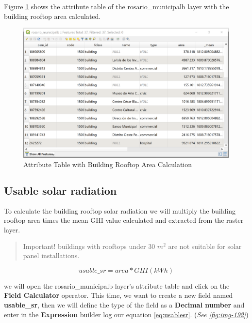 \documentclass[
]{book}
\begin{document}
Figure \ref{fig:img-191} shows the attribute table of the {rosario\_municipalb} layer with the building rooftop area calculated.

\begin{figure}

{\centering \includegraphics[width=1\linewidth]{images/processing4} 

}

\caption{Attribute Table with Building Rooftop Area Calculation}\label{fig:img-191}
\end{figure}

\hypertarget{usable-solar-radiation}{%
\subsection{Usable solar radiation}\label{usable-solar-radiation}}

To calculate the building rooftop solar radiation we will multiply the building rooftop area times the mean GHI value calculated and extracted from the raster layer.

\begin{quote}
Important! buildings with rooftops under 30 \(m^2\) are not suitable for solar panel installations.
\end{quote}

\begin{equation}
usable\_sr = area * GHI (kWh)
\label{eq:usablesr}
\end{equation}

we will open the {rosario\_municipalb} layer's attribute table and click on the \textbf{Field Calculator} operator. This time, we want to create a new field named \textbf{usable\_sr}, then we will define the type of the field as a \textbf{Decimal number} and enter in the \textbf{Expression} builder log our equation \eqref{eq:usablesr}. (\emph{See \ref{fig:img-192}})
\end{document}
